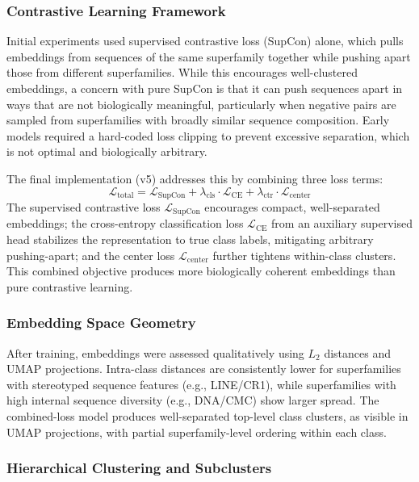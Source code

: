 \documentclass[12pt]{article}
\begin{document}
\subsubsection{Contrastive Learning Framework}

Initial experiments used supervised contrastive loss (SupCon) alone, which pulls embeddings from sequences of the same superfamily together while pushing apart those from different superfamilies. While this encourages well-clustered embeddings, a concern with pure SupCon is that it can push sequences apart in ways that are not biologically meaningful, particularly when negative pairs are sampled from superfamilies with broadly similar sequence composition. Early models required a hard-coded loss clipping to prevent excessive separation, which is not optimal and biologically arbitrary. 

The final implementation (v5) addresses this by combining three loss terms:
\[
\mathcal{L}_{\text{total}} = \mathcal{L}_{\text{SupCon}} + \lambda_{\text{cls}} \cdot \mathcal{L}_{\text{CE}} + \lambda_{\text{ctr}} \cdot \mathcal{L}_{\text{center}}
\]
The supervised contrastive loss $\mathcal{L}_{\text{SupCon}}$ encourages compact, well-separated embeddings; the cross-entropy classification loss $\mathcal{L}_{\text{CE}}$ from an auxiliary supervised head stabilizes the representation to true class labels, mitigating arbitrary pushing-apart; and the center loss $\mathcal{L}_{\text{center}}$ further tightens within-class clusters. This combined objective produces more biologically coherent embeddings than pure contrastive learning.

\subsubsection{Embedding Space Geometry}

After training, embeddings were assessed qualitatively using $L_2$ distances and UMAP projections. Intra-class distances are consistently lower for superfamilies with stereotyped sequence features (e.g., LINE/CR1), while superfamilies with high internal sequence diversity (e.g., DNA/CMC) show larger spread. The combined-loss model produces well-separated top-level class clusters, as visible in UMAP projections, with partial superfamily-level ordering within each class.

\subsubsection{Hierarchical Clustering and Subclusters}
\end{document}
